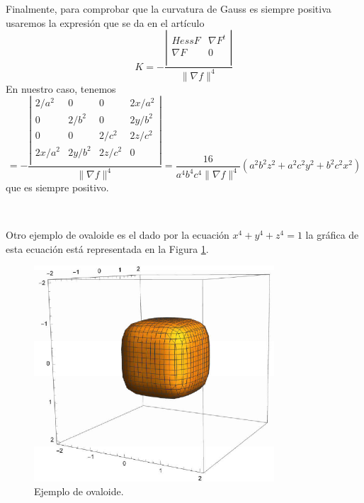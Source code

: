 \begin{ejemplo}
	
	Finalmente, para comprobar que la curvatura de Gauss es siempre positiva usaremos la expresión que se da en el artículo \cite{RonGoldman}
	$$
		K = - \frac{ \left| {\begin{array}{cc}
				Hess F & \nabla F^t \\ 
				\nabla F & 0 \\
				\end{array} } \right| }{\| \nabla f \|^4}		 
	$$
	En nuestro caso, tenemos
	\[
		= - \frac{ \left| {\begin{array}{cccc}
				2/a^2 & 0 & 0 & 2x/a^2 \\ 
				0 & 2/b^2 & 0 & 2y/b^2 \\ 
				0 & 0 & 2/c^2 & 2z/c^2 \\ 
				2x/a^2 & 2y/b^2 & 2z/c^2 & 0 \\
				\end{array} } \right| }{\| \nabla f \|^4}
		= \frac{16}{a^4b^4c^4 \| \nabla f \|^4}(a^2 b^2 z^2+a^2c^2y^2+b^2c^2x^2)
	\]
	que es siempre positivo.
\end{ejemplo}
${ }$\\

\begin{ejemplo}
	Otro ejemplo de ovaloide es el dado por la ecuación $x^4 + y^4 + z^4 = 1$ la gráfica de esta ecuación está representada en la Figura \ref{fig:etiq_11}.
		\begin{figure}
			\begin{center}
				\includegraphics[width=0.8\textwidth]{imagenes/ovaloide2.png}
			\end{center}
			\caption{Ejemplo de ovaloide.}
			\label{fig:etiq_11}
		\end{figure}
\end{ejemplo}
${ }$\\

